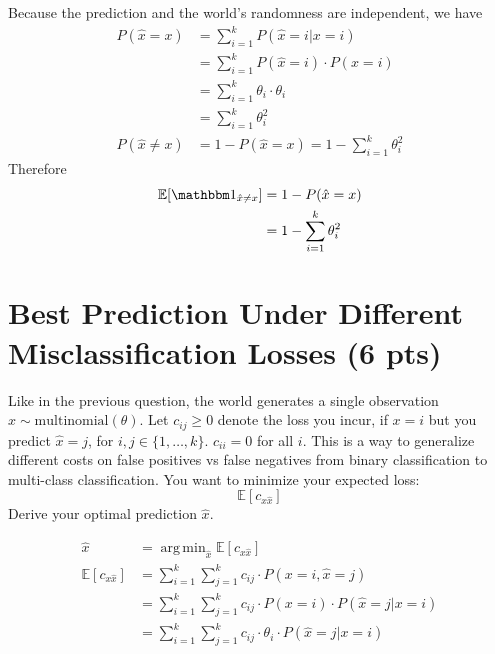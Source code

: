 \documentclass[a4paper]{article}
\theoremstyle{definition}
\DeclareMathOperator*{\argmin}{arg\,min}
\def\E{\mathbb E}
\def\ind{\mathbbm 1}
\newenvironment{soln}{
    \leavevmode\color{blue}\ignorespaces
}{}
\begin{document}
\begin{soln}
	Because the prediction and the world's randomness are independent, we have
	\begin{align*}
		P(\hat{x} = x)    & = \sum_{i=1}^{k} P(\hat{x} = i | x = i)              \\
		                  & = \sum_{i=1}^{k}  P(\hat{x} = i) \cdot P(x = i)      \\
		                  & = \sum_{i=1}^{k} \theta_i \cdot \theta_i             \\
		                  & = \sum_{i=1}^{k} \theta_i^2                          \\
		P(\hat{x} \neq x) & = 1 - P(\hat{x} = x) = 1 - \sum_{i=1}^{k} \theta_i^2
	\end{align*}
	Therefore
	\begin{align*}
		\E[\ind_{\hat x \neq x}] & = 1 - P(\hat{x} = x)            \\
		                         & = 1 - \sum_{i=1}^{k} \theta_i^2
	\end{align*}

\end{soln}


\section{Best Prediction Under Different Misclassification Losses (6 pts)}
Like in the previous question,
the world generates a single observation $x \sim \mbox{multinomial}(\theta)$.
Let $c_{ij} \ge 0$ denote the loss you incur, if $x=i$ but you predict $\hat x=j$, for $i,j \in \{1, \ldots, k\}$.
$c_{ii}=0$ for all $i$.
This is a way to generalize different costs on false positives vs false negatives from binary classification to multi-class classification.
You want to minimize your expected loss:
$$\E[c_{x \hat x}]$$
Derive your optimal prediction $\hat x$.

\begin{soln}
	\begin{align*}
		\hat x           & = \argmin_{\hat x} \E[c_{x \hat x}]                                                \\
		\E[c_{x \hat x}] & = \sum_{i=1}^{k} \sum_{j=1}^{k} c_{ij} \cdot P(x = i, \hat{x} = j)                 \\
		                 & = \sum_{i=1}^{k} \sum_{j=1}^{k} c_{ij} \cdot P(x = i) \cdot P(\hat{x} = j | x = i) \\
		                 & = \sum_{i=1}^{k} \sum_{j=1}^{k} c_{ij} \cdot \theta_i \cdot P(\hat{x} = j | x = i)
	\end{align*}
\end{soln}
\end{document}

